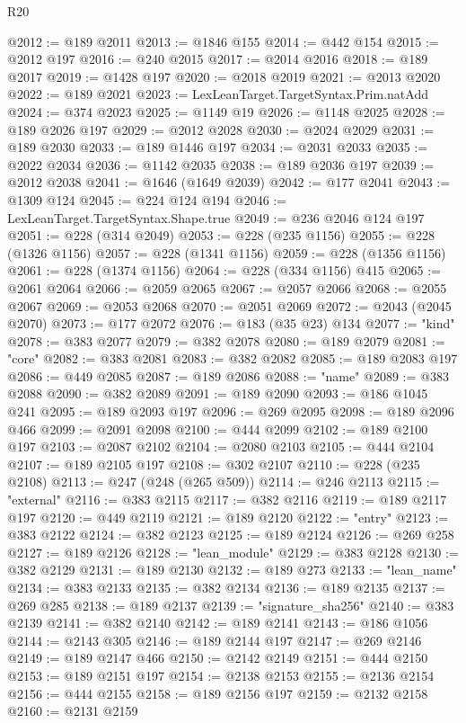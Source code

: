 \begin{lexlean}{R20}
\begin{coremodule}
@2012 := @189 @2011
@2013 := @1846 @155
@2014 := @442 @154
@2015 := @2012 @197
@2016 := @240 @2015
@2017 := @2014 @2016
@2018 := @189 @2017
@2019 := @1428 @197
@2020 := @2018 @2019
@2021 := @2013 @2020
@2022 := @189 @2021
@2023 := LexLeanTarget.TargetSyntax.Prim.natAdd
@2024 := @374 @2023
@2025 := @1149 @19
@2026 := @1148 @2025
@2028 := @189 @2026 @197
@2029 := @2012 @2028
@2030 := @2024 @2029
@2031 := @189 @2030
@2033 := @189 @1446 @197
@2034 := @2031 @2033
@2035 := @2022 @2034
@2036 := @1142 @2035
@2038 := @189 @2036 @197
@2039 := @2012 @2038
@2041 := @1646 (@1649 @2039)
@2042 := @177 @2041
@2043 := @1309 @124
@2045 := @224 @124 @194
@2046 := LexLeanTarget.TargetSyntax.Shape.true
@2049 := @236 @2046 @124 @197
@2051 := @228 (@314 @2049)
@2053 := @228 (@235 @1156)
@2055 := @228 (@1326 @1156)
@2057 := @228 (@1341 @1156)
@2059 := @228 (@1356 @1156)
@2061 := @228 (@1374 @1156)
@2064 := @228 (@334 @1156) @415
@2065 := @2061 @2064
@2066 := @2059 @2065
@2067 := @2057 @2066
@2068 := @2055 @2067
@2069 := @2053 @2068
@2070 := @2051 @2069
@2072 := @2043 (@2045 @2070)
@2073 := @177 @2072
@2076 := @183 (@35 @23) @134
@2077 := "kind"
@2078 := @383 @2077
@2079 := @382 @2078
@2080 := @189 @2079
@2081 := "core"
@2082 := @383 @2081
@2083 := @382 @2082
@2085 := @189 @2083 @197
@2086 := @449 @2085
@2087 := @189 @2086
@2088 := "name"
@2089 := @383 @2088
@2090 := @382 @2089
@2091 := @189 @2090
@2093 := @186 @1045 @241
@2095 := @189 @2093 @197
@2096 := @269 @2095
@2098 := @189 @2096 @466
@2099 := @2091 @2098
@2100 := @444 @2099
@2102 := @189 @2100 @197
@2103 := @2087 @2102
@2104 := @2080 @2103
@2105 := @444 @2104
@2107 := @189 @2105 @197
@2108 := @302 @2107
@2110 := @228 (@235 @2108)
@2113 := @247 (@248 (@265 @509))
@2114 := @246 @2113
@2115 := "external"
@2116 := @383 @2115
@2117 := @382 @2116
@2119 := @189 @2117 @197
@2120 := @449 @2119
@2121 := @189 @2120
@2122 := "entry"
@2123 := @383 @2122
@2124 := @382 @2123
@2125 := @189 @2124
@2126 := @269 @258
@2127 := @189 @2126
@2128 := "lean_module"
@2129 := @383 @2128
@2130 := @382 @2129
@2131 := @189 @2130
@2132 := @189 @273
@2133 := "lean_name"
@2134 := @383 @2133
@2135 := @382 @2134
@2136 := @189 @2135
@2137 := @269 @285
@2138 := @189 @2137
@2139 := "signature_sha256"
@2140 := @383 @2139
@2141 := @382 @2140
@2142 := @189 @2141
@2143 := @186 @1056
@2144 := @2143 @305
@2146 := @189 @2144 @197
@2147 := @269 @2146
@2149 := @189 @2147 @466
@2150 := @2142 @2149
@2151 := @444 @2150
@2153 := @189 @2151 @197
@2154 := @2138 @2153
@2155 := @2136 @2154
@2156 := @444 @2155
@2158 := @189 @2156 @197
@2159 := @2132 @2158
@2160 := @2131 @2159

\end{coremodule}
\end{lexlean}
